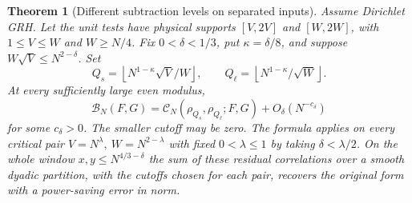 \documentclass[11pt,a4paper]{article}
\numberwithin{equation}{section}
\newtheorem{theorem}{Theorem}[section]
\newcommand{\B}{\mathcal B_N}
\begin{document}
\begin{theorem}[Different subtraction levels on separated inputs]
\label{thm:two-level-packets}
Assume Dirichlet GRH. Let the unit tests have physical supports
$[V,2V]$ and $[W,2W]$, with $1\le V\le W$ and $W\ge N/4$.
Fix $0<\delta<1/3$, put $\kappa=\delta/8$, and suppose
$W\sqrt V\le N^{2-\delta}$. Set
\[
 Q_s=\left\lfloor N^{1-\kappa}\sqrt V/W\right\rfloor,\qquad
 Q_\ell=\left\lfloor N^{1-\kappa}/\sqrt W\right\rfloor .
\]
At every sufficiently large even modulus,
\begin{equation}
 \B(F,G)=\mathcal C_N(\rho_{Q_s},\rho_{Q_\ell};F,G)
                          +O_\delta(N^{-c_\delta})
 \label{eq:two-level-packets}
\end{equation}
for some $c_\delta>0$. The smaller cutoff may be zero.
The formula applies on every critical pair
$V=N^\lambda,\ W=N^{2-\lambda}$ with fixed $0<\lambda\le1$
by taking $\delta<\lambda/2$. On the whole window
$x,y\le N^{4/3-\delta}$ the sum of these residual correlations
over a smooth dyadic partition, with the cutoffs chosen for each
pair, recovers the original form with a power-saving error in norm.
\end{theorem}
\end{document}

